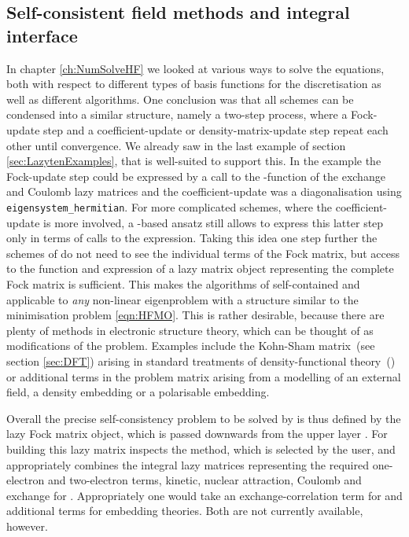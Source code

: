 \subsection{Self-consistent field methods and integral interface}
\label{sec:GscfGint}
In chapter \vref{ch:NumSolveHF} we looked at various ways to solve the
\HF equations, both with respect to different types of basis functions
for the discretisation as well as different \SCF algorithms.
One conclusion was that all \SCF schemes can be
condensed into a similar structure,
namely a two-step process,
where a Fock-update step and a coefficient-update or density-matrix-update step
repeat each other until convergence.
We already saw in the last example of section
\vref{sec:LazytenExamples},
that \lazyten is well-suited to support this.
In the example the Fock-update step could be expressed
by a call to the \update-function of the exchange and Coulomb lazy matrices
and the coefficient-update was
a diagonalisation using \texttt{eigensystem\_hermitian}.
For more complicated \SCF schemes, where the coefficient-update is more involved,
a \contraction-based ansatz still allows to express
this latter step only in terms of calls to the \contraction expression.
Taking this idea one step further the \SCF schemes
of \gscf do not need to see the individual terms of the Fock matrix,
but access to the \update function and \contraction expression
of a lazy matrix object representing the complete Fock matrix is sufficient.
This makes the algorithms of \gscf self-contained
and applicable to \emph{any} non-linear eigenproblem
with a structure similar to the \HF minimisation problem \eqref{eqn:HFMO}.
This is rather desirable,
because there are plenty of methods in electronic structure theory,
which can be thought of as modifications of the \HF problem.
Examples include the Kohn-Sham matrix~(see section \vref{sec:DFT})
arising in standard treatments of density-functional theory~(\DFT)
or additional terms in the problem matrix
arising from a modelling of an external field,
a density embedding or a polarisable embedding.

Overall the precise self-consistency problem to be solved by \gscf
is thus defined by the lazy Fock matrix object,
which is passed downwards from the upper layer \molsturm.
For building this lazy matrix
\molsturm inspects the method, which is selected by the user,
and appropriately combines the integral lazy matrices
representing the required one-electron and two-electron terms,
\ie kinetic, nuclear attraction, Coulomb and exchange for \HF.
Appropriately one would take an exchange-correlation term for \DFT
and additional terms for embedding theories.
Both are not currently available, however.

